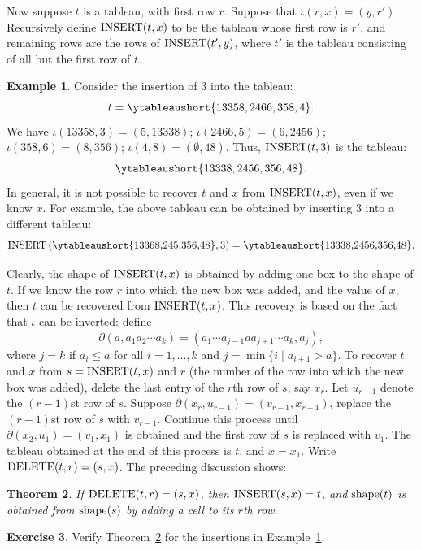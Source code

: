 \documentclass[11pt]{amsproc}
\newtheorem{theorem}{Theorem}[subsection]
\theoremstyle{definition}
\theoremstyle{example}
\newtheorem{example}[theorem]{Example}
\newtheorem{exercise}[theorem]{Exercise}
\newcommand{\rins}{\iota}
\newcommand{\ins}{\textup{INSERT}}
\newcommand{\del}{\textup{DELETE}}
\newcommand{\rdel}{\partial}
\newcommand{\shape}{\textup{shape}}
\begin{document}
Now suppose $t$ is a tableau, with first row $r$.
Suppose that $\rins(r,x) = (y, r')$.
Recursively define $\ins(t,x)$ to be the tableau whose first row is $r'$, and remaining rows are the rows of $\ins(t',y)$,
where $t'$ is the tableau consisting of all but the first row of $t$.
\begin{example}
  \label{example:insertion}
  Consider the insertion of $3$ into the tableau:
  \begin{displaymath}
    t = \ytableaushort{13358,2466,358,4}.
  \end{displaymath}
  We have $\rins(13358,3) = (5,13338)$; $\rins(2466,5)=(6,2456)$; $\rins(358,6)=(8,356)$; $\rins(4,8)=(\emptyset,48)$.
  Thus, $\ins(t, 3)$ is the tableau:
  \begin{displaymath}
    \ytableaushort{13338,2456,356,48}.
  \end{displaymath}
In general, it is not possible to recover $t$ and $x$ from $\ins(t,x)$, even if we know $x$.
For example, the above tableau can be obtained by inserting $3$ into a different tableau:
\begin{displaymath}
  \ins\left(\vcenter{\hbox{\ytableaushort{13368,245,356,48}}}, 3\right) = \vcenter{\hbox{\ytableaushort{13338,2456,356,48}}}.
\end{displaymath}
\end{example}
Clearly, the shape of $\ins(t,x)$ is obtained by adding one box to the shape of $t$.
If we know the row $r$ into which the new box was added, and the value of $x$, then $t$ can be recovered from $\ins(t,x)$.
This recovery is based on the fact that $\rins$ can be inverted:
define
\begin{displaymath}
  \rdel(a, a_1a_2\dotsb a_k) = (a_1\dotsb a_{j-1}aa_{j+1}\dotsb a_k, a_j),
\end{displaymath}
where $j=k$ if $a_i\leq a$ for all $i=1,\dotsc, k$ and $j = \min\{i\mid a_{i+1}>a\}$.
To recover $t$ and $x$ from $s=\ins(t,x)$ and $r$ (the number of the row into which the new box was added), delete the last entry of the $r$th row of $s$, say $x_r$.
Let $u_{r-1}$ denote the $(r-1)$st row of $s$.
Suppose $\rdel(x_r,u_{r-1}) = (v_{r-1},x_{r-1})$, replace the $(r-1)$st row of $s$ with $v_{r-1}$.
Continue this process until $\rdel(x_2,u_1)=(v_1,x_1)$ is obtained and the first row of $s$ is replaced with $v_1$.
The tableau obtained at the end of this process is $t$, and $x=x_1$.
Write $\del(t,r)=(s,x)$.
The preceding discussion shows:
\begin{theorem}
  \label{theorem:del-ins}
  If $\del(t,r)=(s,x)$, then $\ins(s,x)=t$, and $\shape(t)$ is obtained from $\shape(s)$ by adding a cell to its $r$th row.
\end{theorem}
\begin{exercise}
  Verify Theorem~\ref{theorem:del-ins} for the insertions in Example~\ref{example:insertion}.
\end{exercise}
\end{document}
